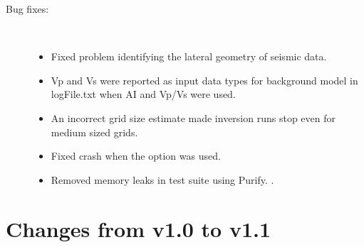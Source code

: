 \begin{description}
\item [Bug fixes:] \mbox{ }
  \begin{itemize}
    \item Fixed problem identifying the lateral geometry of seismic
      data. 
    \item Vp and Vs were reported as input data types for background
      model in logFile.txt when AI and Vp/Vs were used. 
    \item An incorrect grid size estimate made inversion runs stop
      even for medium sized grids. 
    \item Fixed crash when the  option was
      used. 
    \item Removed memory leaks in test suite using Purify. .
  \end{itemize}
\end{description}


\section{Changes from v1.0 to v1.1}

